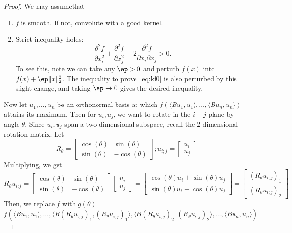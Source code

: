 \begin{proof}
We may assume\wog that
\begin{enumerate}
\item
$f$ is smooth. If not, convolute with a good kernel.
\item
Strict inequality holds:
\[
\frac{\partial^2 f}{\partial x_i^2} + \frac{\partial^2 f}{\partial x_j^2} - 2 \frac{\partial^2 f}{\partial x_i\partial x_j} > 0 .
\]
To see this, note we can take any $\ep > 0$ and perturb $f(x)$ into $f(x) + \ep \|x\|_2^2$. The inequality to prove~\eqref{eq:kf0} is also perturbed by this slight change, and taking $\ep \to 0$ gives the desired inequality.
\end{enumerate}

Now let $u_1, \ldots, u_n$ be an orthonormal basis at which $f(\langle Bu_1, u_1 \rangle, \ldots, \langle Bu_n, u_n\rangle)$ attains its maximum. Then for $u_i, u_j$, we want to rotate in the $i-j$ plane by angle $\theta$. Since $u_i, u_j$ span a two dimensional subspace, recall the $2$-dimensional rotation matrix.
Let 
\[
R_{\theta} = 
\begin{bmatrix}
\cos(\theta) & \sin(\theta) \\
\sin(\theta) & -\cos(\theta)
\end{bmatrix}; 
u_{i;j} = 
\begin{bmatrix}
u_i \\
u_j
\end{bmatrix}
\]
Multiplying, we get
\[
R_{\theta}u_{i;j} = 
\begin{bmatrix}
\cos(\theta) & \sin(\theta) \\
\sin(\theta) & -\cos(\theta)
\end{bmatrix}
\begin{bmatrix}
u_i \\
u_j
\end{bmatrix}
= 
\begin{bmatrix}
\cos(\theta)u_i + \sin(\theta)u_j \\
\sin(\theta)u_i -\cos(\theta)u_j
\end{bmatrix}
= 
\begin{bmatrix}
\left(R_{\theta}u_{i;j}\right)_1 \\
\left(R_{\theta}u_{i;j}\right)_2
\end{bmatrix}
\] 
Then, we replace $f$ with $g(\theta) =$ %
\[
f\left(\langle Bu_1, u_1 \rangle, \ldots, \langle B\left(R_{\theta}u_{i;j}\right)_1, \left(R_{\theta}u_{i;j}\right)_1 \rangle, \langle B\left(R_{\theta}u_{i;j}\right)_2, \left(R_{\theta}u_{i;j}\right)_2\rangle, \ldots, \langle Bu_n, u_n \rangle\right)
\]
\end{proof}
